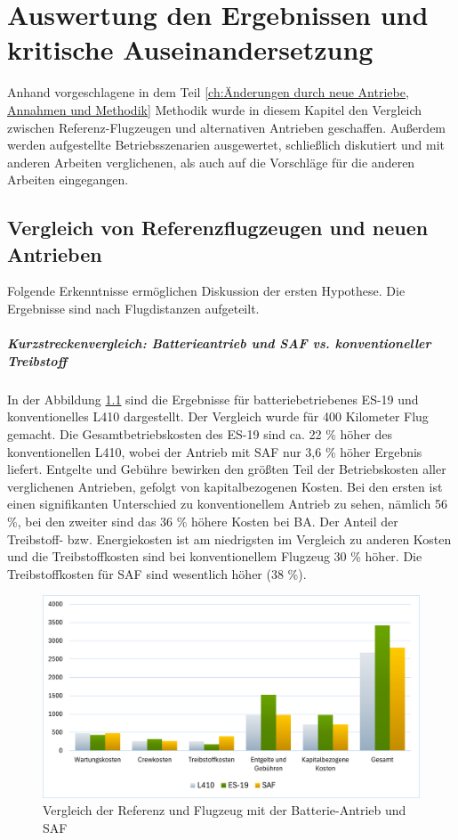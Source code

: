 \chapter{Auswertung den Ergebnissen und kritische Auseinandersetzung}
\label{ch:Auswertung den Ergebnissen}
Anhand vorgeschlagene in dem Teil \ref{ch:Änderungen durch neue Antriebe, Annahmen und Methodik} Methodik wurde in diesem 
Kapitel den Vergleich zwischen Referenz-Flugzeugen und alternativen Antrieben geschaffen.
Außerdem werden aufgestellte Betriebsszenarien ausgewertet, schließlich diskutiert und mit anderen Arbeiten verglichenen, als auch auf die
Vorschläge für die anderen Arbeiten eingegangen.

\section{Vergleich von Referenzflugzeugen und neuen Antrieben}
\label{s:Ergebnisse_Flugzeuge}
Folgende Erkenntnisse ermöglichen Diskussion der ersten Hypothese. Die Ergebnisse sind nach Flugdistanzen aufgeteilt.\\
%
\paragraph{Kurzstreckenvergleich: Batterieantrieb und SAF vs. konventioneller Treibstoff}
%
In der Abbildung \ref{vergleichBA_Ref} sind die Ergebnisse für batteriebetriebenes ES-19 und konventionelles L410 dargestellt.
Der Vergleich wurde für 400 Kilometer Flug gemacht.
%
Die Gesamtbetriebskosten des ES-19 sind ca. 22 \% höher des konventionellen L410, wobei der Antrieb mit SAF nur 3,6 \% höher
Ergebnis liefert. Entgelte und Gebühre bewirken den größten Teil der Betriebskosten
aller verglichenen Antrieben, gefolgt von kapitalbezogenen Kosten. Bei den ersten ist einen signifikanten Unterschied zu 
konventionellem Antrieb zu sehen, 
nämlich 56 \%, bei den zweiter sind das 36 \% höhere Kosten bei BA. Der Anteil der Treibstoff- bzw. Energiekosten ist am niedrigsten 
im Vergleich zu anderen Kosten und die Treibstoffkosten sind bei konventionellem Flugzeug 30 \% höher. Die Treibstoffkosten für SAF
sind wesentlich höher (38 \%).

\begin{figure}[h]
	\centering
	\includegraphics[width=0.9\linewidth]{Bilder/VergleichBA_Ref.png}
	\caption[Betriebskosten]{Vergleich der Referenz und Flugzeug mit der Batterie-Antrieb und SAF}
	\label{vergleichBA_Ref}
\end{figure}


